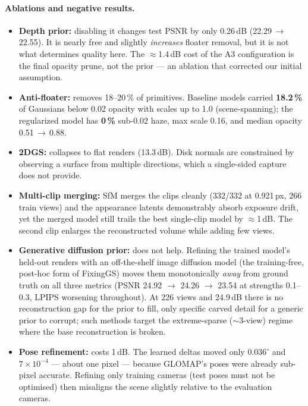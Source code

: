 \paragraph{Ablations and negative results.}
\begin{itemize}
  \item \textbf{Depth prior:} disabling it changes test PSNR by only 0.26\,dB
        (22.29\,$\rightarrow$\,22.55). It is nearly free and slightly \emph{increases}
        floater removal, but it is not what determines quality here. The
        $\approx$1.4\,dB cost of the A3 configuration is the final opacity prune, not
        the prior --- an ablation that corrected our initial assumption.
  \item \textbf{Anti-floater:} removes 18--20\,\% of primitives. Baseline models
        carried \textbf{18.2\,\%} of Gaussians below 0.02 opacity with scales up to
        1.0 (scene-spanning); the regularized model has \textbf{0\,\%} sub-0.02 haze,
        max scale 0.16, and median opacity 0.51\,$\rightarrow$\,0.88.
  \item \textbf{2DGS:} collapses to flat renders (13.3\,dB). Disk normals are
        constrained by observing a surface from multiple directions, which a
        single-sided capture does not provide.
  \item \textbf{Multi-clip merging:} SfM merges the clips cleanly (332/332 at
        0.921\,px, 266 train views) and the appearance latents demonstrably absorb
        exposure drift, yet the merged model still trails the best single-clip model
        by $\approx$1\,dB. The second clip enlarges the reconstructed volume while
        adding few views.
  \item \textbf{Generative diffusion prior:} does not help. Refining the trained
        model's held-out renders with an off-the-shelf image diffusion model (the
        training-free, post-hoc form of FixingGS) moves them monotonically
        \emph{away} from ground truth on all three metrics (PSNR 24.92 $\to$ 24.26
        $\to$ 23.54 at strengths 0.1--0.3, LPIPS worsening throughout). At 226 views and
        24.9\,dB there is no reconstruction gap for the prior to fill, only specific
        carved detail for a generic prior to corrupt; such methods target the
        extreme-sparse ($\sim$3-view) regime where the base reconstruction is broken.
  \item \textbf{Pose refinement:} costs 1\,dB. The learned deltas moved only
        $0.036^\circ$ and $7\times10^{-4}$ --- about one pixel --- because GLOMAP's
        poses were already sub-pixel accurate. Refining only training cameras (test
        poses must not be optimised) then misaligns the scene slightly relative to
        the evaluation cameras.
\end{itemize}

